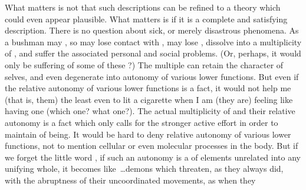 What matters is not that such descriptions can be refined to a theory which
could even appear plausible. What matters is if it is a complete and satisfying
description.  There is no question about sick, or merely disastrous phenomena.
As a bushman may , so  may lose contact with ,  may lose , dissolve into a multiplicity of ,
and suffer the associated personal and social problems. (Or, perhaps, it would
only be suffering of some of these ?)  The multiple  can
retain the character of selves, and even degenerate into autonomy of various
lower functions.  But even if  the relative autonomy of various
lower functions is a fact, it would not help me (that is, them) the least even
to lit a cigarette when I am (they are) feeling like having one (which one? what
one?).  The actual multiplicity of  and their relative autonomy is a
fact which only calls for the stronger active effort in order to maintain
 of being.  It would be hard to deny relative autonomy of
various lower functions, not to mention cellular or even molecular processes in
the body.  But if we forget the little word , if such an autonomy
is a  of elements unrelated into any unifying whole, it becomes
like~\ldots demons which threaten, as they always did, with the abruptness of
their uncoordinated movements, as when they 

